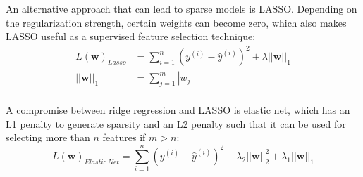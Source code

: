 An alternative approach that can lead to sparse models is LASSO. Depending on the regularization strength, certain weights can become zero, which also makes LASSO useful as a supervised feature selection technique:
\begin{equation}
    \begin{aligned}
        L(\textbf{w})_{Lasso} & =\sum_{i=1}^{n}(y^{(i)}-\hat{y}^{(i)})^2+\lambda||\textbf{w}||_1 \\
        ||\textbf{w}||_1      & =\sum_{j=1}^{m}|w_j|                                             \\
    \end{aligned}
\end{equation}

A compromise between ridge regression and LASSO is elastic net, which has an L1 penalty to generate sparsity and an L2 penalty such that it can be used for selecting more than $n$ features if $m > n$:
\begin{equation}
    L(\textbf{w})_{Elastic~Net}=\sum_{i=1}^{n}(y^{(i)}-\hat{y}^{(i)})^2+\lambda_2||\textbf{w}||^2_2+\lambda_1||\textbf{w}||_1
\end{equation}